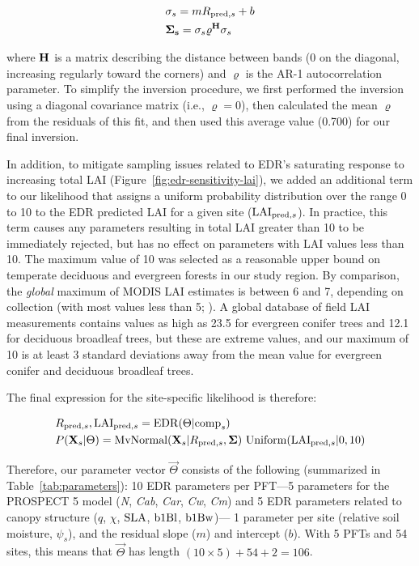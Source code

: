 \begin{align}
  & \relax{\sigma_{s}} = m R_{\mathrm{pred}, s} + b \\
  & \mathbf{\Sigma_{s}} = \relax{\sigma_{s}} \varrho^{\mathbf{H}} \relax{\sigma_{s}}
\end{align}

where $\mathbf{H}$ is a matrix describing the distance between bands (0 on the diagonal, increasing regularly toward the corners) and $\varrho$ is the AR-1 autocorrelation parameter.
To simplify the inversion procedure, we first performed the inversion using a diagonal covariance matrix (i.e., $\varrho = 0$), then calculated the mean $\varrho$ from the residuals of this fit, and then used this average value (0.700) for our final inversion.

In addition, to mitigate sampling issues related to EDR's saturating response to increasing total LAI (Figure~\ref{fig:edr-sensitivity-lai}), we added an additional term to our likelihood that assigns a uniform probability distribution over the range 0 to 10 to the EDR predicted LAI for a given site ($\mathrm{LAI}_{\mathrm{pred}, s}$).
In practice, this term causes any parameters resulting in total LAI greater than 10 to be immediately rejected, but has no effect on parameters with LAI values less than 10.
The maximum value of 10 was selected as a reasonable upper bound on temperate deciduous and evergreen forests in our study region.
By comparison, the \emph{global} maximum of MODIS LAI estimates is between 6 and 7, depending on collection (with most values less than 5; \citealt{fang2012validation, yan2016evaluation}).
A global database of field LAI measurements \citep{iio2014global} contains values as high as 23.5 for evergreen conifer trees and 12.1 for deciduous broadleaf trees, but these are extreme values, and our maximum of 10 is at least 3 standard deviations away from the mean value for evergreen conifer and deciduous broadleaf trees.

The final expression for the site-specific likelihood is therefore:

\begin{align}
  & R_{\mathrm{pred}, s}, \mathrm{LAI}_{\mathrm{pred}, s} = \mathrm{EDR}(\relax{\Theta} | \mathrm{comp}_{s}) \\
  & P(\mathbf{X}_{s} | \relax{\Theta}) =
  \mathrm{MvNormal}(\mathbf{X}_{s} | R_{\mathrm{pred}, s}, \mathbf{\Sigma}) ~
  \mathrm{Uniform}(\mathrm{LAI}_{\mathrm{pred}, s} | 0, 10)
\end{align}

Therefore, our parameter vector $\vec{\Theta}$ consists of the following (summarized in Table~\ref{tab:parameters}):
10 EDR parameters per PFT---5 parameters for the PROSPECT 5 model (\emph{N}, \emph{Cab}, \emph{Car}, \emph{Cw}, \emph{Cm}) and 5 EDR parameters related to canopy structure ($q$, $\chi$, $\mathrm{SLA}$, $\mathrm{b1Bl}$, $\mathrm{b1Bw}$)---
1 parameter per site (relative soil moisture, $\psi_{s}$),
and the residual slope ($m$) and intercept ($b$).
With 5 PFTs and 54 sites, this means that $\vec{\Theta}$ has length $(10 \times 5) + 54 + 2 = 106$.

